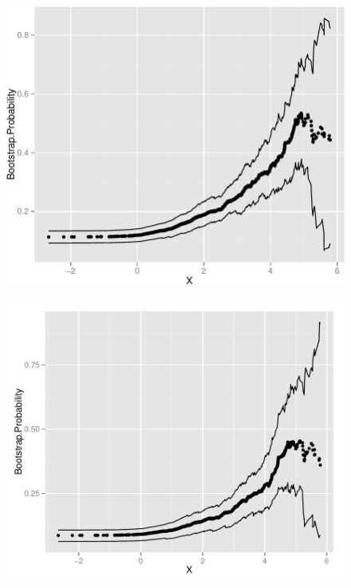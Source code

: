 \documentclass[11pt,]{article}
\begin{document}
\newpage

\begin{figure}[htbp]
\centering
\includegraphics{manuscript_files/figure-latex/who_drink_cp_plot-1.pdf}
\caption{}
\end{figure}

\newpage

\begin{figure}[htbp]
\centering
\includegraphics{manuscript_files/figure-latex/epa_adult_cp -1.pdf}
\caption{}
\end{figure}
\end{document}
